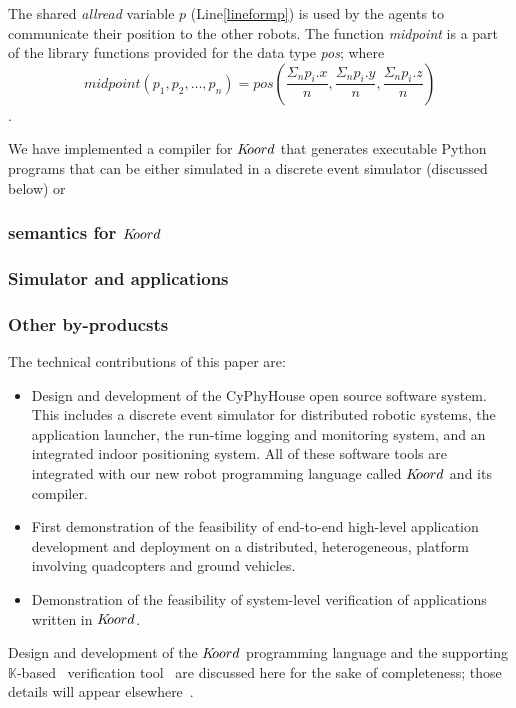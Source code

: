 
The shared \emph{allread} variable $p$ (Line\ref{lineformp}) is used by the agents to communicate their position to the other robots. The function \emph{midpoint} is a part of the library functions provided for the data type \emph{pos}; where $$\mathit{midpoint}(p_1,p_2,\ldots,p_n) = pos(\frac{\Sigma_n p_i.x}{n},\frac{\Sigma_n p_i.y}{n},\frac{\Sigma_n p_i.z}{n}) $$.



We have implemented a compiler for $K\kern-2pt oord$ that generates executable Python programs that can be either simulated in a discrete event simulator (discussed below) or 

\subsubsection{\K semantics for $K\kern-2pt oord$}

\subsubsection{Simulator and applications}

\subsubsection{Other by-producsts}

The technical contributions of this paper are:
\begin{itemize}
\item Design and development of the CyPhyHouse open source software system. This includes a discrete event simulator for distributed robotic systems, the application launcher, the run-time logging and monitoring system, and an integrated indoor positioning system. All of these software tools are integrated with our new robot programming language called $K\kern-2pt oord$ and its compiler. 
\item First demonstration of the feasibility of end-to-end high-level application development and deployment on a distributed, heterogeneous, platform involving quadcopters and ground vehicles. 
\item Demonstration of the feasibility of system-level verification of applications written in $K\kern-2pt oord$. 
\end{itemize}
Design and development of the $K\kern-2pt oord$ programming language and the supporting $\mathbb{K}$-based~\cite{Kpaper} verification tool \kbmc\, are discussed here for the sake of completeness; those details will appear elsewhere~\cite{koordreport}.

